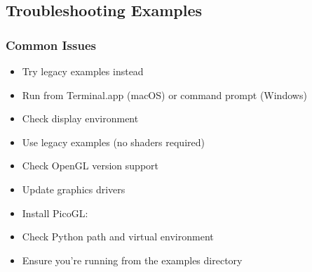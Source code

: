 \documentclass[a4paper,10pt,english,openany,oneside]{sphinxmanual}
\begin{document}
\subsection{Troubleshooting Examples}
\label{\detokenize{examples:troubleshooting-examples}}

\subsubsection{Common Issues}
\label{\detokenize{examples:common-issues}}\begin{description}
\begin{itemize}
\item {} 
\sphinxAtStartPar
Try legacy examples instead

\item {} 
\sphinxAtStartPar
Run from Terminal.app (macOS) or command prompt (Windows)

\item {} 
\sphinxAtStartPar
Check display environment

\end{itemize}

\begin{itemize}
\item {} 
\sphinxAtStartPar
Use legacy examples (no shaders required)

\item {} 
\sphinxAtStartPar
Check OpenGL version support

\item {} 
\sphinxAtStartPar
Update graphics drivers

\end{itemize}

\begin{itemize}
\item {} 
\sphinxAtStartPar
Install PicoGL: 

\item {} 
\sphinxAtStartPar
Check Python path and virtual environment

\end{itemize}

\begin{itemize}
\item {} 
\sphinxAtStartPar
Ensure you’re running from the examples directory


\end{itemize}
\end{description}
\end{document}
